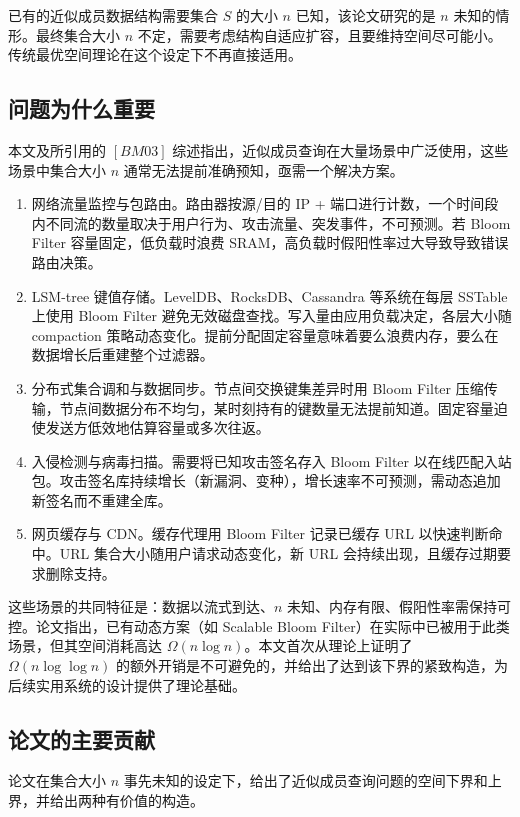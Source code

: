 \documentclass[UTF8,11pt,a4paper]{ctexart}
\begin{document}
已有的近似成员数据结构需要集合 $S$ 的大小 $n$ 已知，该论文研究的是 $n$ 未知的情形。最终集合大小 $n$ 不定，需要考虑结构自适应扩容，且要维持空间尽可能小。传统最优空间理论在这个设定下不再直接适用。

\subsection{问题为什么重要}

本文及所引用的 $[BM03]$ 综述指出，近似成员查询在大量场景中广泛使用，这些场景中集合大小 $n$ 通常无法提前准确预知，亟需一个解决方案。

\begin{enumerate}
    \item 网络流量监控与包路由。路由器按源/目的 IP + 端口进行计数，一个时间段内不同流的数量取决于用户行为、攻击流量、突发事件，不可预测。若 Bloom Filter 容量固定，低负载时浪费 SRAM，高负载时假阳性率过大导致导致错误路由决策。
    \item LSM-tree 键值存储。LevelDB、RocksDB、Cassandra 等系统在每层 SSTable 上使用 Bloom Filter 避免无效磁盘查找。写入量由应用负载决定，各层大小随 compaction 策略动态变化。提前分配固定容量意味着要么浪费内存，要么在数据增长后重建整个过滤器。
    \item 分布式集合调和与数据同步。节点间交换键集差异时用 Bloom Filter 压缩传输，节点间数据分布不均匀，某时刻持有的键数量无法提前知道。固定容量迫使发送方低效地估算容量或多次往返。
    \item 入侵检测与病毒扫描。需要将已知攻击签名存入 Bloom Filter 以在线匹配入站包。攻击签名库持续增长（新漏洞、变种），增长速率不可预测，需动态追加新签名而不重建全库。
    \item 网页缓存与 CDN。缓存代理用 Bloom Filter 记录已缓存 URL 以快速判断命中。URL 集合大小随用户请求动态变化，新 URL 会持续出现，且缓存过期要求删除支持。
\end{enumerate}

这些场景的共同特征是：数据以流式到达、$n$ 未知、内存有限、假阳性率需保持可控。论文指出，已有动态方案（如 Scalable Bloom Filter）在实际中已被用于此类场景，但其空间消耗高达 $\Omega(n\log n)$。本文首次从理论上证明了 $\Omega(n\log\log n)$ 的额外开销是不可避免的，并给出了达到该下界的紧致构造，为后续实用系统的设计提供了理论基础。

\subsection{论文的主要贡献}

论文在集合大小 $n$ 事先未知的设定下，给出了近似成员查询问题的空间下界和上界，并给出两种有价值的构造。
\end{document}
